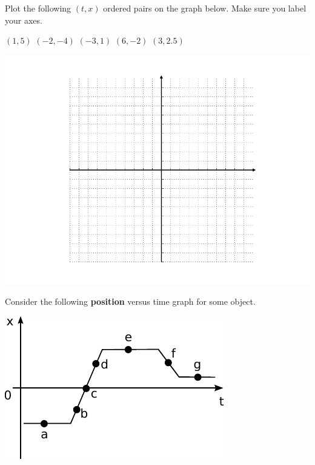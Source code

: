 \documentclass[12pt]{exam}
\begin{document}
\begin{questions}
\question
Plot the following $(t, x)$ ordered pairs on the graph below. Make sure you label your axes.

$(1, 5)$ $(-2, -4)$ $(-3, 1)$ $(6, -2)$ $(3, 2.5)$

\begin{center}
\includegraphics[width=\linewidth]{../images/coop3_grid.png}
\end{center}

\clearpage
\question
Consider the following \textbf{position} versus time graph for some object. 

\begin{center}
\includegraphics{../images/coop2_posVsTime.pdf}
\end{center}

\end{questions}
\end{document}
